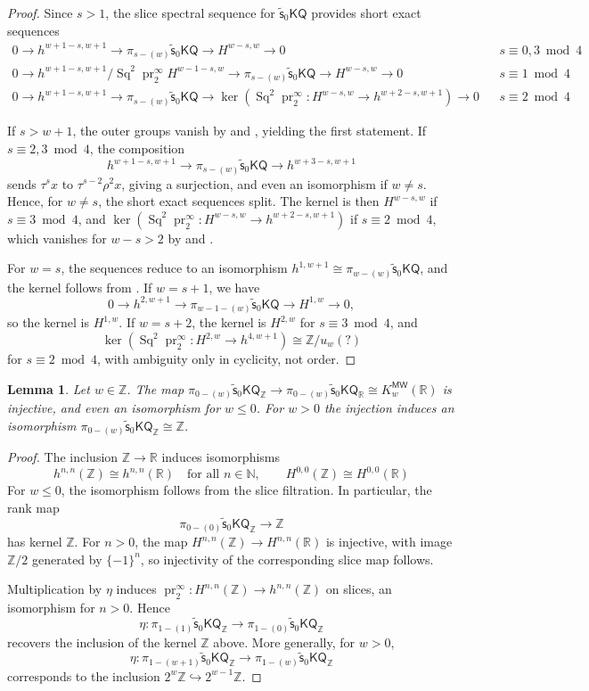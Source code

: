 \documentclass[11pt,hyp,english]{article}
\newcommand{\Z}{\mathbb{Z}}
\newcommand{\N}{\mathbb{N}}
\newcommand{\KQ}{\mathsf{KQ}}
\newcommand{\R}{\mathbb{R}}
\newcommand{\Sq}{\operatorname{Sq}}
\newcommand{\pr}{\operatorname{pr}}
\newcommand{\vs}{\tilde{\mathsf{s}}}
\newcommand{\MW}{{\mathsf{MW}}}
\let\iso=\cong
\newtheorem{lemma}[theorem]{Lemma}
\theoremstyle{definition}
\begin{document}
\begin{proof}
Since $s>1$, the slice spectral sequence for $\vs_0\KQ$ provides short exact sequences 
\begin{align*} 
0\to h^{w+1-s,w+1}\to \pi_{s-(w)}\vs_0\KQ \to H^{w-s,w}\to 0 && s\equiv 0,3 \bmod 4 \\
0\to h^{w+1-s,w+1}\!/\!\Sq^2\pr^\infty_2\! H^{w-1-s,w}\to \pi_{s-(w)}\vs_0\KQ \to H^{w-s,w}\to 0 && s\equiv 1 \bmod 4 \\
0\to h^{w+1-s,w+1}\to \pi_{s-(w)}\vs_0\KQ \to \ker(\Sq^2\pr^\infty_2\colon \! H^{w-s,w}\to h^{w+2-s,w+1})\to 0 && s\equiv 2 \bmod 4 
\end{align*}

If $s>w+1$, the outer groups vanish by  and , yielding the first statement. 
If $s\equiv 2,3 \bmod 4$, the composition 
\[
h^{w+1-s,w+1} \to \pi_{s-(w)}\vs_0\KQ \to h^{w+3-s,w+1}
\] 
sends $\tau^s x$ to $\tau^{s-2}\rho^2 x$, giving a surjection, and even an isomorphism if $w\neq s$. 
Hence, for $w\neq s$, the short exact sequences split. The kernel is then $H^{w-s,w}$ if $s\equiv 3 \bmod 4$, and $\ker(\Sq^2\pr^\infty_2\colon H^{w-s,w}\to h^{w+2-s,w+1})$ if $s\equiv 2\bmod 4$, which vanishes for $w-s>2$ by  and . 

For $w=s$, the sequences reduce to an isomorphism $h^{1,w+1}\cong \pi_{w-(w)}\vs_0\KQ$, and the kernel follows from . 
If $w=s+1$, we have 
\[
0 \to h^{2,w+1} \to \pi_{w-1-(w)}\vs_0\KQ \to H^{1,w} \to 0,
\] 
so the kernel is $H^{1,w}$. 
If $w=s+2$, the kernel is $H^{2,w}$ for $s\equiv 3 \bmod 4$, and 
\[
\ker(\Sq^2\pr^\infty_2\colon H^{2,w}\to h^{4,w+1}) \cong \Z/u_w(?)
\] 
for $s\equiv 2 \bmod 4$, with ambiguity only in cyclicity, not order.
\end{proof}

\begin{lemma}\label{lem:pi0V}
Let $w\in\Z$. 
The map $\pi_{0-(w)}\vs_0\KQ_\Z\to \pi_{0-(w)}\vs_0\KQ_\R\iso K^\MW_w(\R)$ is injective, and even an isomorphism for $w\leq 0$.
For $w>0$ the injection induces an isomorphism $\pi_{0-(w)}\vs_0\KQ_\Z\iso \Z$.
\end{lemma}

\begin{proof}
The inclusion $\Z \to \R$ induces isomorphisms 
\[
h^{n,n}(\Z) \cong h^{n,n}(\R) \quad \text{for all } n \in \N, \qquad 
H^{0,0}(\Z) \cong H^{0,0}(\R)
\] 
For $w \le 0$, the isomorphism follows from the slice filtration. In particular, the rank map 
\[
\pi_{0-(0)} \vs_0 \KQ_\Z \to \Z
\] 
has kernel $\Z$. For $n>0$, the map $H^{n,n}(\Z) \to H^{n,n}(\R)$ is injective, with image $\Z/2$ generated by $\{-1\}^n$, so injectivity of the corresponding slice map follows.  

Multiplication by $\eta$ induces $\pr^\infty_2\colon H^{n,n}(\Z)\to h^{n,n}(\Z)$ on slices, an isomorphism for $n>0$. Hence 
\[
\eta\colon \pi_{1-(1)}\vs_0\KQ_\Z \to \pi_{1-(0)}\vs_0\KQ_\Z
\] 
recovers the inclusion of the kernel $\Z$ above. More generally, for $w>0$, 
\[
\eta\colon \pi_{1-(w+1)}\vs_0\KQ_\Z \to \pi_{1-(w)}\vs_0\KQ_\Z
\] 
corresponds to the inclusion $2^w \Z \hookrightarrow 2^{w-1} \Z$.
\end{proof}
\end{document}
